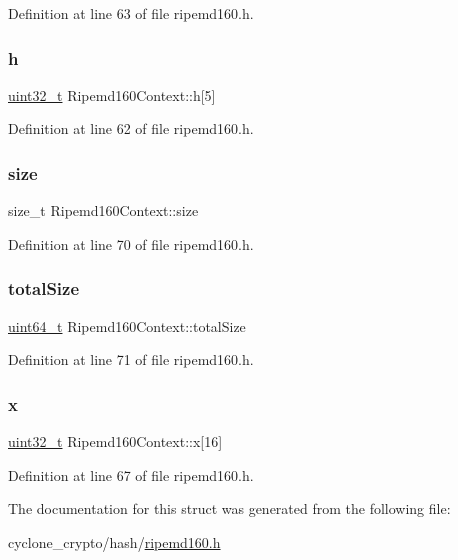 Definition at line 63 of file ripemd160.\+h.

\mbox{\label{structRipemd160Context_a6c5ff8f0ea800ef3d9fc426d316556e4}} 
\subsubsection{\texorpdfstring{h}{h}}
{\footnotesize\ttfamily \hyperlink{stdint_8h_a435d1572bf3f880d55459d9805097f62}{uint32\+\_\+t} Ripemd160\+Context\+::h\mbox{[}5\mbox{]}}



Definition at line 62 of file ripemd160.\+h.

\mbox{\label{structRipemd160Context_aaa2e817af0eb5951231c1c68593e979c}} 
\subsubsection{\texorpdfstring{size}{size}}
{\footnotesize\ttfamily size\+\_\+t Ripemd160\+Context\+::size}



Definition at line 70 of file ripemd160.\+h.

\mbox{\label{structRipemd160Context_a0667a665699002d8b5020c0ee40ef829}} 
\subsubsection{\texorpdfstring{total\+Size}{totalSize}}
{\footnotesize\ttfamily \hyperlink{stdint_8h_aec6fcb673ff035718c238c8c9d544c47}{uint64\+\_\+t} Ripemd160\+Context\+::total\+Size}



Definition at line 71 of file ripemd160.\+h.

\mbox{\label{structRipemd160Context_a379a476500ffa72b9aab1492bfa7dd7a}} 
\subsubsection{\texorpdfstring{x}{x}}
{\footnotesize\ttfamily \hyperlink{stdint_8h_a435d1572bf3f880d55459d9805097f62}{uint32\+\_\+t} Ripemd160\+Context\+::x\mbox{[}16\mbox{]}}



Definition at line 67 of file ripemd160.\+h.



The documentation for this struct was generated from the following file\+:\begin{DoxyCompactItemize}
\item 
cyclone\+\_\+crypto/hash/\hyperlink{ripemd160_8h}{ripemd160.\+h}\end{DoxyCompactItemize}
